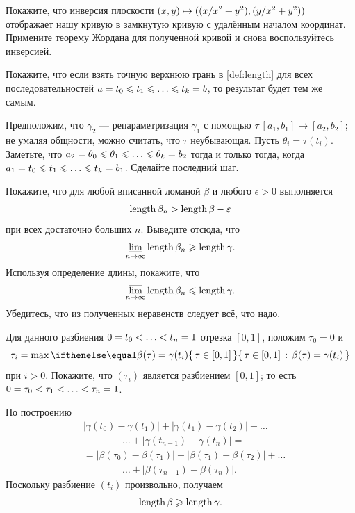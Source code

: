 Покажите, что инверсия плоскости $(x,y)\z\mapsto (\tfrac{x}{x^2+y^2},\tfrac{y}{x^2+y^2})$ отображает нашу кривую в замкнутую кривую с удалённым началом координат.
Примените теорему Жордана для полученной кривой и снова воспользуйтесь инверсией.



\setcounter{eqtn}{0}

Покажите, что если взять точную верхнюю грань в \ref{def:length} для всех последовательностей
$a=t_0\le t_1\le\z\dots\le t_k=b$, то результат будет тем же самым.

Предположим, что $\gamma_2$ --- репараметризация $\gamma_1$ с помощью $\tau\:[a_1,b_1]\to [a_2,b_2]$; не умаляя общности, можно считать, что $\tau$ неубывающая.
Пусть $\theta_i=\tau(t_i)$.
Заметьте, что $a_2=\theta_0\z\le\theta_1\le \z\dots\le\theta_k=b_2$ тогда и только тогда, когда 
$a_1=t_0\le t_1\le\z\dots\le t_k=b_1$.
Сделайте последний шаг.

Покажите, что для любой вписанной ломаной $\beta$ и любого $\epsilon>0$ выполняется
\[\mathop{\rm length}\nolimits\beta_n>\mathop{\rm length}\nolimits\beta-\varepsilon\]
при всех достаточно больших $n$.
Выведите отсюда, что
\[\varliminf_{n\to\infty}\mathop{\rm length}\nolimits\beta_n\geqslant \mathop{\rm length}\nolimits \gamma.\]
Используя определение длины, покажите, что 
\[\varlimsup_{n\to\infty}\mathop{\rm length}\nolimits\beta_n\leqslant \mathop{\rm length}\nolimits \gamma.\]
Убедитесь, что из полученных неравенств следует всё, что надо.

Для данного разбиения $0=t_0<\z\dots <t_n\z=1$ отрезка $[0,1]$, положим $\tau_0=0$ и 
\[\tau_i=\max\set{\tau \in[0,1]}{\beta(\tau)=\gamma(t_i)}\]
при $i>0$.
Покажите, что $(\tau_i)$ является разбиением $[0,1]$;
то есть $0=\tau_0<\tau_1<\z\dots<\tau_n=1$.

По построению 
\begin{align*}
&|\gamma(t_0)-\gamma(t_1)|+|\gamma(t_1)-\gamma(t_2)|+\dots
\\
&\qquad\qquad\dots+|\gamma(t_{n-1})-\gamma(t_n)|=
\\
&=
|\beta(\tau_0)-\beta(\tau_1)|+|\beta(\tau_1)-\beta(\tau_2)|+\dots
\\
&\qquad\qquad\dots+|\beta(\tau_{n-1})-\beta(\tau_n)|.
\end{align*}
Поскольку разбиение $(t_i)$ произвольно, получаем 
\[\mathop{\rm length}\nolimits \beta\geqslant \mathop{\rm length}\nolimits \gamma.\]

